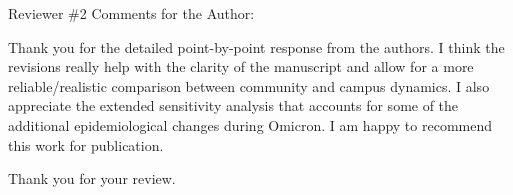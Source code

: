 \documentclass[12pt]{article}
\newcommand{\revtext}{\textsf}
\begin{document}
\revtext{Reviewer \#2 Comments for the Author:}

\revtext{Thank you for the detailed point-by-point response from the authors. I think the revisions really help with the clarity of the manuscript and allow for a more reliable/realistic comparison between community and campus dynamics. I also appreciate the extended sensitivity analysis that accounts for some of the additional epidemiological changes during Omicron. I am happy to recommend this work for publication.}

Thank you for your review.


\end{document}
